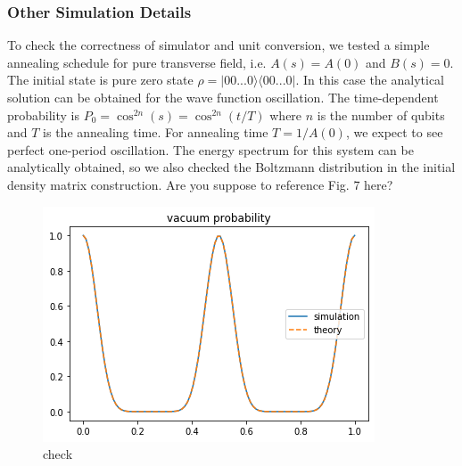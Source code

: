 \documentclass[prd,twocolumn,tightenlines,preprintnumbers,showpacs,superscriptaddress,notitlepage,nofootinbib,eqsecnum,floatfix,longbibliography,aps,10pt]{revtex4-2}
\begin{document}
\subsubsection{Other Simulation Details}
\label{sec:methods:simulation_details}
To check the correctness of simulator and unit conversion, we tested a simple annealing schedule for pure transverse field, i.e. $A(s)=A(0)$ and $B(s)=0$.
The initial state is pure zero state $\rho=|00...0\rangle \langle 00...0|$.
In this case the analytical solution can be obtained for the wave function oscillation.
The time-dependent probability is $P_{0}=\cos^{2n}(s)=\cos^{2n}(t/T)$ where $n$ is the number of qubits and $T$ is the annealing time.
For annealing time $T=1/A(0)$, we expect to see perfect one-period oscillation. The energy spectrum for this system can be analytically obtained, so we also checked the Boltzmann distribution in the initial density matrix construction.
{\color{red} Are you suppose to reference Fig. 7 here?}

\begin{figure}
	\centering
	\includegraphics[width=\columnwidth]{./figures/check.png}
	\caption{check}
	\label{fig:check}
\end{figure}
\end{document}
